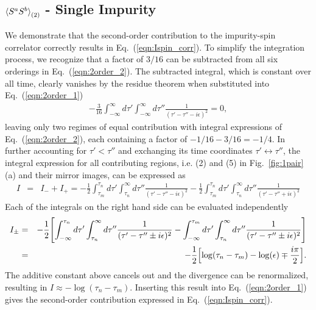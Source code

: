 \documentclass[aps,prb,twocolumn,superscriptaddress]{revtex4-1}
\begin{document}
\begin{widetext}
\section{$\braket{S^{a}S^{b}}_{(2)}$ - Single Impurity} \label{app:spincorr_int}
We demonstrate that the second-order contribution to the impurity-spin correlator correctly results in Eq.~(\ref{eqn:Ispin_corr}). To simplify the integration process, we recognize that a factor of $3/16$ can be subtracted from all six orderings in Eq.~(\ref{eqn:2order_2}). The subtracted integral, which is constant over all time, clearly vanishes by the residue theorem when substituted into Eq.~(\ref{eqn:2order_1})
\begin{eqnarray}
-\frac{3}{16}\int_{-\infty}^{\infty} d\tau' \int_{-\infty}^{\infty}d\tau'' \frac{1}{(\tau'-\tau''-i\epsilon)^{2}}=0, \label{eqn:2order_3}
\end{eqnarray}
leaving only two regimes of equal contribution with integral expressions of Eq.~(\ref{eqn:2order_2}), each containing a factor of $-1/16-3/16=-1/4$. In further accounting for $\tau'<\tau''$ and exchanging its time coordinates $\tau'\leftrightarrow\tau''$, the integral expression for all contributing regions, i.e. (2) and (5) in Fig.~\ref{fig:1pair}(a) and their mirror images, can be expressed as 
\begin{eqnarray}
I&=&I_{-}+I_{+}=-\frac{1}{2}\int_{\tau_{m}}^{\tau_{n}} d\tau' \int_{\tau_{n}}^{\infty}d\tau'' \frac{1}{(\tau'-\tau''-i\epsilon)^{2}} -\frac{1}{2}\int_{\tau_{m}}^{\tau_{n}} d\tau' \int_{\tau_{n}}^{\infty}d\tau'' \frac{1}{(\tau'-\tau''+i\epsilon)^{2}} 
\end{eqnarray}
Each of the integrals on the right hand side can be evaluated independently
\begin{eqnarray}
I_{\pm}&=&-\frac{1}{2}\Biggl[\int_{-\infty}^{\tau_{n}} d\tau' \int_{\tau_{n}}^{\infty}d\tau'' \frac{1}{(\tau'-\tau''\pm i\epsilon)^{2}}-\int_{-\infty}^{\tau_{m}} d\tau' \int_{\tau_{n}}^{\infty}d\tau'' \frac{1}{(\tau'-\tau''\pm i\epsilon)^{2}}\Biggr] \\
&=&-\frac{1}{2}\Bigl[\log(\tau_{n}-\tau_{m})-\log(\epsilon)\mp\frac{i\pi}{2}\Bigr]. \label{eqn:2order_5}
\end{eqnarray}
The additive constant above cancels out and the divergence can be renormalized, resulting in $I\approx-\log(\tau_{n}-\tau_{m})$. Inserting this result into Eq.~(\ref{eqn:2order_1}) gives the second-order contribution expressed in Eq.~(\ref{eqn:Ispin_corr}). 
\end{widetext}
\end{document}

